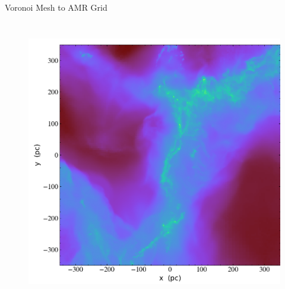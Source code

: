 \documentclass[aspectratio=169]{beamer}
\begin{document}
\begin{frame}{Voronoi Mesh to AMR Grid}
\begin{columns}
\begin{column}{0.3\textwidth}
\begin{figure}[h!]
                \label{fig:amr_example}
            \end{figure}
        \end{column}
    \end{columns}
\end{frame} 

\begin{frame}
    \centering
    \begin{figure}[h!]
        \includegraphics[width=0.5\linewidth]{../images/VorAMR_hdf5_chk_0001_Projection_z_dens.png}
    \end{figure}
\end{frame}
%
%
%
%
%
%
%
%
%
\end{document}

